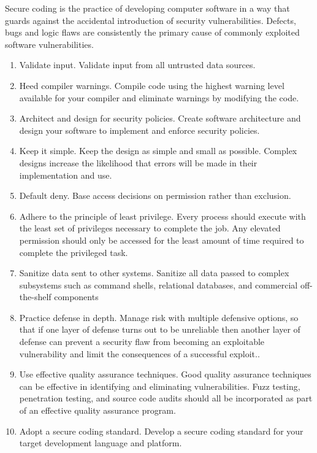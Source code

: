 \documentclass{article}
\begin{document}
\begin{enumerate}
     Secure coding is the practice of developing computer software in a way that guards against the accidental introduction of security vulnerabilities. Defects, bugs and logic flaws are consistently the primary cause of commonly exploited software vulnerabilities.
\begin{enumerate}
    \item Validate input. Validate input from all untrusted data sources. 
    \item	Heed compiler warnings. Compile code using the highest warning level available for your compiler and eliminate warnings by modifying the code.
    \item	 Architect and design for security policies. Create software architecture and design your software to implement and enforce security policies. 
    \item	Keep it simple. Keep the design as simple and small as possible. Complex designs increase the likelihood that errors will be made in their implementation and use.
    \item	Default deny. Base access decisions on permission rather than exclusion. 
    \item	Adhere to the principle of least privilege. Every process should execute with the least set of privileges necessary to complete the job. Any elevated permission should only be accessed for the least amount of time required to complete the privileged task.
    \item	Sanitize data sent to other systems. Sanitize all data passed to complex subsystems such as command shells, relational databases, and commercial off-the-shelf components
    \item	Practice defense in depth. Manage risk with multiple defensive options, so that if one layer of defense turns out to be unreliable then another layer of defense can prevent a security flaw from becoming an exploitable vulnerability and limit the consequences of a successful exploit..
    \item	Use effective quality assurance techniques. Good quality assurance techniques can be effective in identifying and eliminating vulnerabilities. Fuzz testing, penetration testing, and source code audits should all be incorporated as part of an effective quality assurance program. 
    \item	Adopt a secure coding standard. Develop a secure coding standard for your target development language and platform.
\end{enumerate}	


\end{enumerate}
\end{document}
